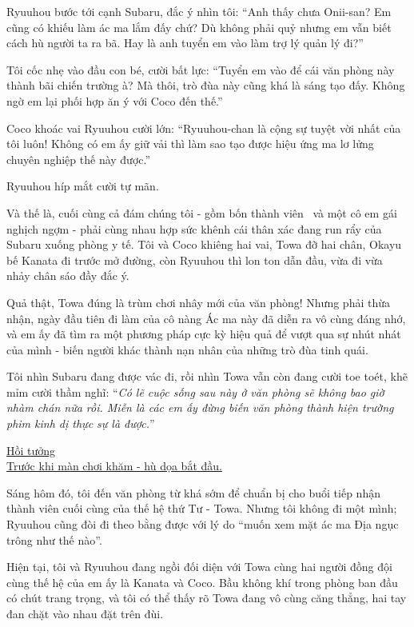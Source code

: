 \documentclass[../main.tex]{subfiles}
\begin{document}
Ryuuhou bước tới cạnh Subaru, đắc ý nhìn tôi: ``Anh thấy chưa Onii-san? Em cũng có khiếu làm ác ma lắm đấy chứ? Dù không phải quỷ nhưng em vẫn biết cách hù người ta ra bã. Hay là anh tuyển em vào làm trợ lý quản lý đi?''

Tôi cốc nhẹ vào đầu con bé, cười bất lực: ``Tuyển em vào để cái văn phòng này thành bãi chiến trường à? Mà thôi, trò đùa này cũng khá là sáng tạo đấy. Không ngờ em lại phối hợp ăn ý với Coco đến thế.''

Coco khoác vai Ryuuhou cười lớn: ``Ryuuhou-chan là cộng sự tuyệt vời nhất của tôi luôn! Không có em ấy giữ vải thì làm sao tạo được hiệu ứng ma lơ lửng chuyên nghiệp thế này được.''

Ryuuhou híp mắt cười tự mãn.

Và thế là, cuối cùng cả đám chúng tôi - gồm bốn thành viên \hll\ và một cô em gái nghịch ngợm - phải cùng nhau hợp sức khênh cái thân xác đang run rẩy của Subaru xuống phòng y tế. Tôi và Coco khiêng hai vai, Towa đỡ hai chân, Okayu bế Kanata đi trước mở đường, còn Ryuuhou thì lon ton dẫn đầu, vừa đi vừa nhảy chân sáo đầy đắc ý.

Quả thật, Towa đúng là trùm chơi nhây mới của văn phòng! Nhưng phải thừa nhận, ngày đầu tiên đi làm của cô nàng Ác ma này đã diễn ra vô cùng đáng nhớ, và em ấy đã tìm ra một phương pháp cực kỳ hiệu quả để vượt qua sự nhút nhát của mình - biến người khác thành nạn nhân của những trò đùa tinh quái.

Tôi nhìn Subaru đang được vác đi, rồi nhìn Towa vẫn còn đang cười toe toét, khẽ mỉm cười thầm nghĩ: ``\textit{Có lẽ cuộc sống sau này ở văn phòng sẽ không bao giờ nhàm chán nữa rồi. Miễn là các em ấy đừng biến văn phòng thành hiện trường phim kinh dị thực sự là được.}''

\ct
\omk

\begin{center}
  \uline{Hồi tưởng\\Trước khi màn chơi khăm - hù dọa bắt đầu.}
\end{center}

Sáng hôm đó, tôi đến văn phòng từ khá sớm để chuẩn bị cho buổi tiếp nhận thành viên cuối cùng của thế hệ thứ Tư - Towa. Nhưng tôi không đi một mình; Ryuuhou cũng đòi đi theo bằng được với lý do ``muốn xem mặt ác ma Địa ngục trông như thế nào''.

Hiện tại, tôi và Ryuuhou đang ngồi đối diện với Towa cùng hai người đồng đội cùng thế hệ của em ấy là Kanata và Coco. Bầu không khí trong phòng ban đầu có chút trang trọng, và tôi có thể thấy rõ Towa đang vô cùng căng thẳng, hai tay đan chặt vào nhau đặt trên đùi.
\end{document}
